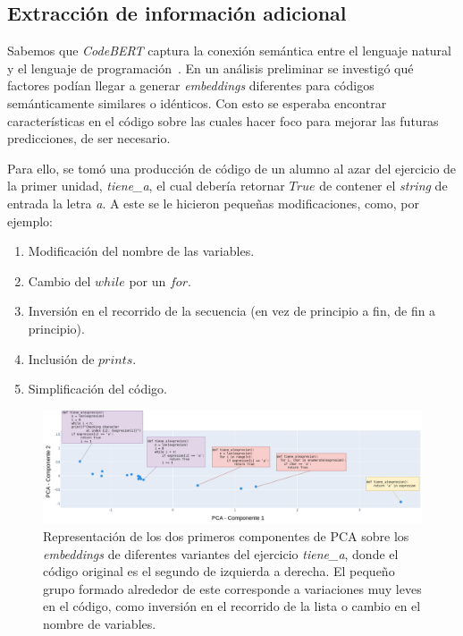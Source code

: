 \documentclass[11pt,a4paper,twoside,openany]{tesis}
\begin{document}
\subsection{Extracción de información adicional}\label{subsec:extraccion}

Sabemos que \emph{CodeBERT} captura la conexión semántica entre el lenguaje natural y el lenguaje de programación~\cite{codeBert}. En un análisis preliminar se investigó qué factores podían llegar a generar \emph{embeddings} diferentes para códigos semánticamente similares o idénticos. Con esto se esperaba encontrar características en el código sobre las cuales hacer foco para mejorar las futuras predicciones, de ser necesario. 

Para ello, se tomó una producción de código de un alumno al azar del ejercicio de la primer unidad, \emph{tiene\_a}, el cual debería retornar $True$ de contener el \emph{string} de entrada la letra \emph{a}. A este se le hicieron pequeñas modificaciones, como, por ejemplo:
\begin{enumerate}
    \item Modificación del nombre de las variables.
    \item Cambio del $while$ por un $for$.
    \item Inversión en el recorrido de la secuencia (en vez de principio a fin, de fin a principio).
    \item Inclusión de $prints$.
    \item Simplificación del código.
\end{enumerate}

\begin{figure}[H]
    \centering
    \includegraphics[width=\textwidth]{imagenes/codigo-similar.png}
    \caption{Representación de los dos primeros componentes de PCA sobre los \emph{embeddings} de diferentes variantes del ejercicio \emph{tiene\_a}, donde el código original es el segundo de izquierda a derecha. El pequeño grupo formado alrededor de este corresponde a variaciones muy leves en el código, como inversión en el recorrido de la lista o cambio en el nombre de variables.}
     \label{variaciones-codigo}
\end{figure}
\end{document}
